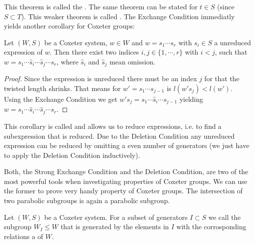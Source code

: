 This theorem is called the . The same theorem can be stated for $t \in S$ (since $S \subset T$). This weaker theorem is called . The Exchange Condition immediatly yields another corollary for Coxeter groups:

\begin{coro}
	\label{deletion-condition}
	Let $(W,S)$ be a Coxeter system, $w \in W$ and $w = s_1 \cdots s_r$ with $s_i \in S$ a unreduced expression of $w$. Then there exist two indices $i,j \in \{1,\cdots,r\}$ with $i < j$, such that $w = s_1 \cdots \hat s_i \cdots \hat s_j \cdots s_r$, where $\hat s_i$ and $\hat s_j$ mean omission.

	\begin{proof}
		Since the expression is unreduced there must be an index $j$ for that the twisted length shrinks. That means for $w' = s_1 \cdots s_{j-1}$ is $l(w' s_j) < l(w')$. Using the Exchange Condition we get $w' s_j = s_1 \cdots \hat s_i \cdots s_{j-1}$ yielding $w = s_1 \cdots \hat s_i \cdots \hat s_j \cdots s_r$.
	\end{proof}
\end{coro}

This corollary is called  and allows us to reduce expressions, i.e. to find a subexpression that is reduced. Due to the Deletion Condition any unreduced expression can be reduced by omitting a even number of generators (we just have to apply the Deletion Condition inductively).

Both, the Strong Exchange Condition and the Deletion Condition, are two of the most powerful tools when investigating properties of Coxeter groups. We can use the former to prove very handy property of Coxeter groups. The intersection of two parabolic subgroups is again a parabolic subgroup.

\begin{defi}
	\label{parabolic-subgroup}
	Let $(W,S)$ be a Coxeter system. For a subset of generators $I \subset S$ we call the subgroup $W_I \leq W$ that is generated by the elements in $I$ with the corrosponding relations a  of $W$.
\end{defi}

